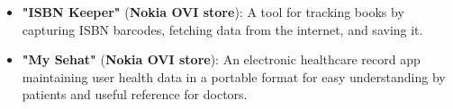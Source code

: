 \documentclass[10pt,a4paper,ragged2e,withhyper]{altacv}
\begin{document}
\begin{paracol}{2}
\divider


\divider


\begin{itemize}
  \item \textbf{"ISBN Keeper"} (\textbf{Nokia OVI store}): A tool for tracking books by capturing ISBN barcodes, fetching data from the internet, and saving it.
  \item \textbf{"My Sehat"} (\textbf{Nokia OVI store}): An electronic healthcare record app maintaining user health data in a portable format for easy understanding by patients and useful reference for doctors.
\end{itemize}

\divider


\end{paracol}
\end{document}
